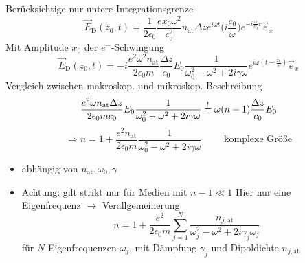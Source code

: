 \documentclass[titlepage,12pt,a4paper,ngerman]{report}
\newcommand{\tx}[1]{\textrm{#1}}
\begin{document}
\begin{itemize}
	Berücksichtige nur untere Integrationsgrenze
	$$\vec{E}_{\tx{D}} (z_0,t) = \frac{1}{2 \epsilon_0} \frac{e x_0 \omega^2}{c_0^2} n_{\tx{at}} \Delta z e^{i \omega t} \Big(i \frac{c_0}{\omega} \Big) e^{-i \frac{\omega}{c_0} r} \vec{e}_x$$
	Mit Amplitude $ x_0 $ der $ e^- $-Schwingung
	$$\vec{E}_{\tx{D}} (z_0,t) = -i \frac{e^2 \omega^2 n_{\tx{at}}}{2 \epsilon_0 m} \frac{\Delta z}{c_0} E_0 \frac{1}{\omega_0^2 - \omega^2 + 2 i \gamma \omega} e^{i \omega (t- \frac{z_0}{c})} \vec{e}_x$$
	Vergleich zwischen makroskop. und mikroskop. Beschreibung
	$$\frac{e^2 \omega n_{\tx{at}} \Delta z}{2 \epsilon_0 m c_0} E_0 \frac{1}{\omega_0^2 - \omega^2 + 2 i \gamma \omega} \buildrel ! \over = \omega (n-1) \frac{\Delta z}{c_0} E_0$$
	$$ \Rightarrow \boxed{n = 1 + \frac{e^2 n_{\tx{at}}}{2 \epsilon_0 m} \frac{1}{\omega_0^2 - \omega^2 + 2 i \gamma \omega}} \qquad \tx{ komplexe Größe}$$
	\begin{itemize}
		\item abhängig von $ n_{\tx{at}}, \omega_0 , \gamma $
		\item Achtung: gilt strikt nur für Medien mit $ n-1 \ll 1 $
		Hier nur eine Eigenfrequenz $ \rightarrow $ Verallgemeinerung
		$$n = 1 + \frac{e^2}{2 \epsilon_0 m} \sum_{j=1}^{N} \frac{n_{j, \tx{at}}}{\omega_j^2 - \omega^2 + 2 i \gamma_j \omega_j}$$
		für $ N $ Eigenfrequenzen $ \omega_j $, mit Dämpfung $ \gamma_j $ und Dipoldichte $ n_{j, \tx{at}} $
	\end{itemize}
\end{itemize}
\end{document}
